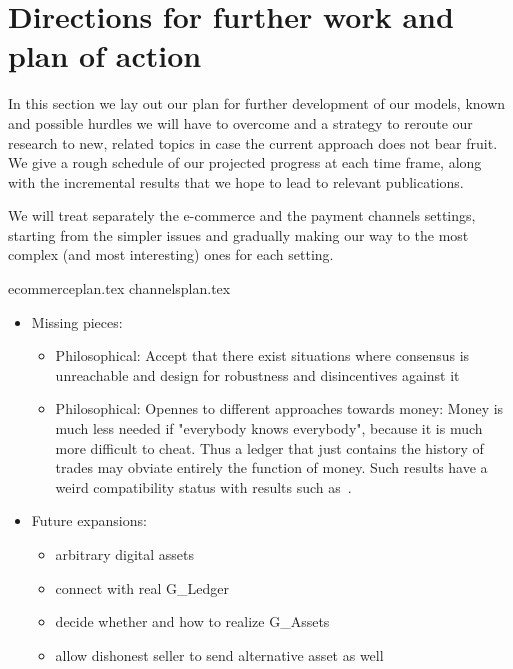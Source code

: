 \section{Directions for further work and plan of action}
\label{sec:plan}
  In this section we lay out our plan for further development of our models, known and
  possible hurdles we will have to overcome and a strategy to reroute our research to new,
  related topics in case the current approach does not bear fruit. We give a rough
  schedule of our projected progress at each time frame, along with the incremental
  results that we hope to lead to relevant publications.

  We will treat separately the e-commerce and the payment channels settings, starting from
  the simpler issues and gradually making our way to the most complex (and most
  interesting) ones for each setting.

  {ecommerceplan.tex}
  {channelsplan.tex}
  \begin{itemize}
    \item Missing pieces:
    \begin{itemize}
      \item Philosophical: Accept that there exist situations where consensus is
      unreachable and design for robustness and disincentives against it
      \item Philosophical: Opennes to different approaches towards money: Money is much
      less needed if "everybody knows everybody", because it is much more difficult to
      cheat. Thus a ledger that just contains the history of trades may obviate entirely
      the function of money. Such results have a weird compatibility status with results
      such as~\cite{marketequilibrium}.
    \end{itemize}
    \item Future expansions:
    \begin{itemize}
      \item arbitrary digital assets
      \item connect with real G\_Ledger
      \item decide whether and how to realize G\_Assets
      \item allow dishonest seller to send alternative asset as well
    \end{itemize}
  \end{itemize}
